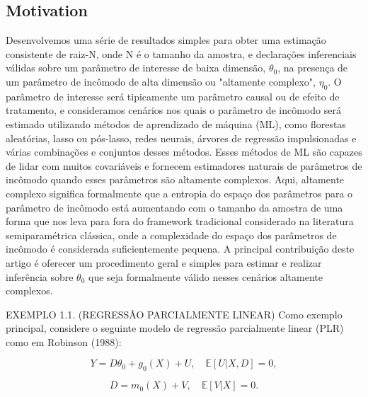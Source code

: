 \documentclass[a4paper,12pt]{article}[abntex2]
\begin{document}
\subsection*{Motivation}
Desenvolvemos uma série de resultados simples para obter uma estimação consistente de raiz-N, onde N é o tamanho da amostra, e declarações inferenciais válidas sobre um parâmetro de interesse de baixa dimensão, $\theta_0$, na presença de um parâmetro de incômodo de alta dimensão ou "altamente complexo", $\eta_0$. O parâmetro de interesse será tipicamente um parâmetro causal ou de efeito de tratamento, e consideramos cenários nos quais o parâmetro de incômodo será estimado utilizando métodos de aprendizado de máquina (ML), como florestas aleatórias, lasso ou pós-lasso, redes neurais, árvores de regressão impulsionadas e várias combinações e conjuntos desses métodos. Esses métodos de ML são capazes de lidar com muitos covariáveis e fornecem estimadores naturais de parâmetros de incômodo quando esses parâmetros são altamente complexos. Aqui, altamente complexo significa formalmente que a entropia do espaço dos parâmetros para o parâmetro de incômodo está aumentando com o tamanho da amostra de uma forma que nos leva para fora do framework tradicional considerado na literatura semiparamétrica clássica, onde a complexidade do espaço dos parâmetros de incômodo é considerada suficientemente pequena. A principal contribuição deste artigo é oferecer um procedimento geral e simples para estimar e realizar inferência sobre $\theta_0$ que seja formalmente válido nesses cenários altamente complexos.

EXEMPLO 1.1. (REGRESSÃO PARCIALMENTE LINEAR) Como exemplo principal, considere o seguinte modelo de regressão parcialmente linear (PLR) como em Robinson (1988):

\begin{equation}
Y = D\theta_0 + g_0(X) + U, \quad \mathbb{E}[U | X,D] = 0,
\end{equation}

\begin{equation}
D = m_0(X) + V, \quad \mathbb{E}[V | X] = 0.
\end{equation}
\end{document}
